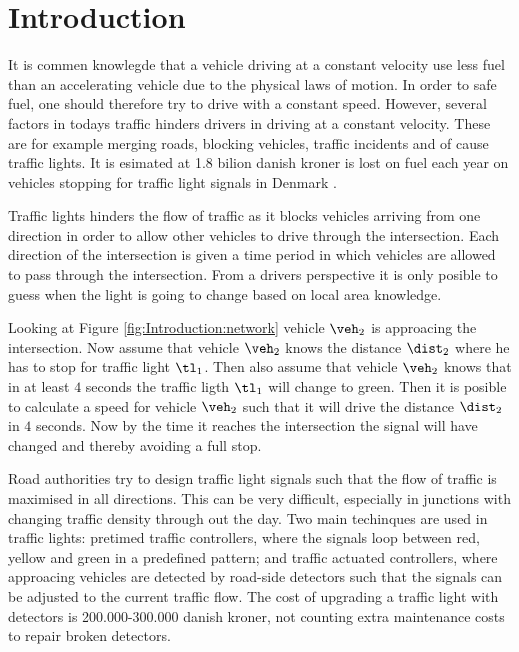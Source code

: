 \section{Introduction}

It is commen knowlegde that a vehicle driving at a constant velocity use less fuel than an accelerating vehicle due to the physical laws of motion.
In order to safe fuel, one should therefore try to drive with a constant speed. 
However, several factors in todays traffic hinders drivers in driving at a constant velocity. 
These are for example merging roads, blocking vehicles, traffic incidents and of cause traffic lights. 
It is esimated at 1.8 bilion danish kroner is lost on fuel each year on vehicles stopping for traffic light signals in Denmark \cite{Vejdir}.

Traffic lights hinders the flow of traffic as it blocks vehicles arriving from one direction in order to allow other vehicles to drive through the intersection.
Each direction of the intersection is given a time period in which vehicles are allowed to pass through the intersection. 
From a drivers perspective it is only posible to guess when the light is going to change based on local area knowledge. 

Looking at Figure \ref{fig:Introduction:network} vehicle $\veh_2$ is approacing the intersection.
Now assume that vehicle $\veh_2$ knows the distance $\dist_2$ where he has to stop for traffic light $\tl_1$. 
Then also assume that vehicle $\veh_2$ knows that in at least $4$ seconds the traffic ligth $\tl_1$ will change to green. 
Then it is posible to calculate a speed for vehicle $\veh_2$ such that it will drive the distance $\dist_2$ in $4$ seconds. 
Now by the time it reaches the intersection the signal will have changed and thereby avoiding a full stop.


Road authorities try to design traffic light signals such that the flow of traffic is maximised in all directions.
This can be very difficult, especially in junctions with changing traffic density through out the day.
Two main techinques are used in traffic lights: pretimed traffic controllers, where the signals loop between red, yellow and green in a predefined pattern; and traffic actuated controllers, where approacing vehicles are detected by road-side detectors such that the signals can be adjusted to the current traffic flow. The cost of upgrading a traffic light with detectors is 200.000-300.000 danish kroner, not counting extra maintenance costs to repair broken detectors\cite{Vejdir}.

